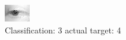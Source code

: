 \begin{figure}[h!]
\begin{center}
\includegraphics[width=0.60\columnwidth]{figures/ID2639_class_3_target_4.png}
\end{center}
\caption{ Classification: 3 actual target: 4}
\label{fig:ID2639_class_3_target_4}
\end{figure}

